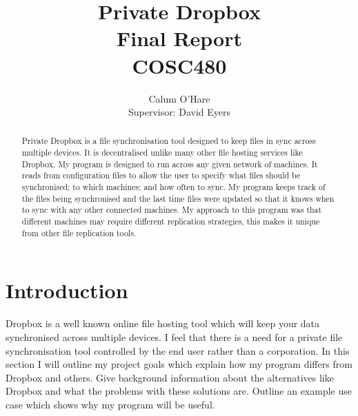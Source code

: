 \documentclass[12pt]{article}
\title{ Private Dropbox \\ Final Report \\ COSC480}
\author{Calum O'Hare \\ Supervisor: David Eyers}
\date{}
\begin{document}
\maketitle

\newpage
\begin{abstract}
Private Dropbox is a file synchronisation tool designed to
keep files in sync across multiple devices. It is decentralised
unlike many other file hosting services like Dropbox.
My program is designed to run across any given network
of machines. It reads from configuration files to allow
the user to specify what files should be synchronised; to which
machines; and how often to sync. My program keeps track
of the files being synchronised and the last time files
were updated so that it knows when to sync with any
other connected machines. My approach to this program
was that different machines may require different replication
strategies, this makes it unique from other file replication tools.
\end{abstract}
\newpage

\tableofcontents
\newpage

\section{Introduction}
Dropbox is a well known online file hosting tool which will
keep your data synchronised across multiple devices. I feel
that there is a need for a private file synchronisation tool
controlled by the end user rather than a corporation. In this
section I will outline my project goals which explain how
my program differs from Dropbox and others. Give background
information about the alternatives like Dropbox and what the
problems with these solutions are. Outline an example
use case which shows why my program will be useful.
\end{document}
